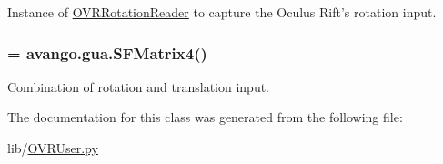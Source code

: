\-Instance of \hyperlink{namespacelib_1_1OVRRotationReader}{\-O\-V\-R\-Rotation\-Reader} to capture the \-Oculus \-Rift's rotation input. 

\hypertarget{classlib_1_1OVRUser_1_1TrackingRotationCombiner_af0898b8f021737fba390f797782860db}{
\subsubsection[{sf\-\_\-combined\-\_\-mat}]{ = avango.\-gua.\-S\-F\-Matrix4()}}\label{classlib_1_1OVRUser_1_1TrackingRotationCombiner_af0898b8f021737fba390f797782860db}


\-Combination of rotation and translation input. 



\-The documentation for this class was generated from the following file\-:\begin{DoxyCompactItemize}
\item 
lib/\hyperlink{OVRUser_8py}{\-O\-V\-R\-User.\-py}\end{DoxyCompactItemize}
